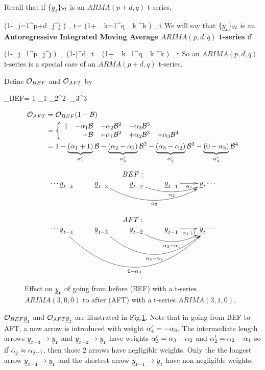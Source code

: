 Recall
that if
${\{{\underline{y}}_t\}_{\forall t}}$ is an $ARMA(p+d,q)$
t-series,

\beq
\left(1-\sum_{j=1}^{p+d}\alp_j\calb^j
\right)
\rvy_t=
\left(1+
\sum_{k=1}^q \nu_k \calb^k
\right)
\rvn_t
\eeq
We will
say that
${\{{\underline{y}}_t\}_{\forall t}}$
is an {\bf Autoregressive Integrated
 Moving Average
$ARIMA(p,d,q)$ t-series} if



\beq
\left(1-\sum_{j=1}^{p}\alp_j\calb^j
\right)
_
{(1-\calb)^d\rvy_t}=
\left(1+
\sum_{k=1}^q \nu_k \calb^k
\right)
\rvn_t
\eeq
So an $ARIMA(p,d,q)$ t-series
is a special
case of an $ARMA(p+d, q)$ t-series.

Define ${\cal O}_{BEF}$ and ${\cal O}_{AFT}$ by

\beq
\calo_{BEF}=
1-\alp_1\calb-\alp_2\calb^2
-\alp_3\calb^3
\eeq

\begin{align}
{\cal O}_{AFT}
&={\cal O}_{BEF}(1-{\cal B})
\\
&=
\left\{
\begin{array}{rrrrr}
1
&-\alpha_1{\cal B}
&-\alpha_2{\cal B}^2
&-\alpha_3{\cal B}^3
\\
&
-{\cal B}
&+\alpha_1{\cal B}^2
&+\alpha_2{\cal B}^3
&+\alpha_3{\cal B}^4
\end{array}
\right.
\\
&=
1  -\underbrace{(\alpha_1+1)}_{\alpha_1'}{\cal B}
-\underbrace{(\alpha_2-\alpha_1)}_{\alpha_2'}{\cal B}^2
-\underbrace{(\alpha_3-\alpha_2)}_{\alpha_3'}{\cal B}^3
-\underbrace{(0-\alpha_3)}_{\alpha_4'}{\cal B}^4
\end{align}

\begin{figure}[h!]
$$
\begin{array}{c}
BEF:
\\
\xymatrix{
\cdots
\rvy_{t-4}
&\rvy_{t-3}\ar@/_2pc/[rrr]_{\alp_3}
&\rvy_{t-2}\ar@/_1pc/[rr]_{\alp_2}
&\rvy_{t-1}\ar[r]_{\alp_1}
&\rvy_t
\cdots
}
\\
\\
AFT:
\\
\xymatrix{
\cdots
\rvy_{t-4}\ar@/_4.5pc/[rrrr]_{0-\alp_3}
&\rvy_{t-3}\ar@/_3pc/[rrr]_{\alp_3-\alp_2}
&\rvy_{t-2}\ar@/_1.5pc/[rr]_{\alp_2-\alp_1}
&\rvy_{t-1}\ar[r]_{\alp_1+1}
&\rvy_t
\cdots
}
\end{array}
$$
\caption{
Effect on ${\underline{y}}_t$
of going from
before (BEF)
with a t-series $ARIMA(3,0,0)$
to after (AFT)
with a t-series $ARIMA(3, 1, 0)$.
}
\label{fig-bef-aft-diff}
\end{figure}

${\cal O}_{BEF}{\underline{y}}_t$
and ${\cal O}_{AFT}{\underline{y}}_t$
are illustrated in
Fig.\ref{fig-bef-aft-diff}.
Note that
in going from BEF to AFT,
a new arrow is
introduced
with weight $\alpha_4'
=-\alpha_3$.
The intermediate length
arrows ${\underline{y}}_{t-3}\rightarrow {\underline{y}}_t$
and ${\underline{y}}_{t-2}\rightarrow {\underline{y}}_t$
have weights $\alpha_3'=\alpha_3-\alpha_2$
and $\alpha_2'=\alpha_2-\alpha_1$
so if $\alpha_j\approx \alpha_{j-1}$,
then those 2
arrows have negligible weights.
Only the
the longest arrow
${\underline{y}}_{t-4}\rightarrow{\underline{y}}_t$
and the shortest arrow ${\underline{y}}_{t-1}\rightarrow {\underline{y}}_t$
have non-negligible weights.

